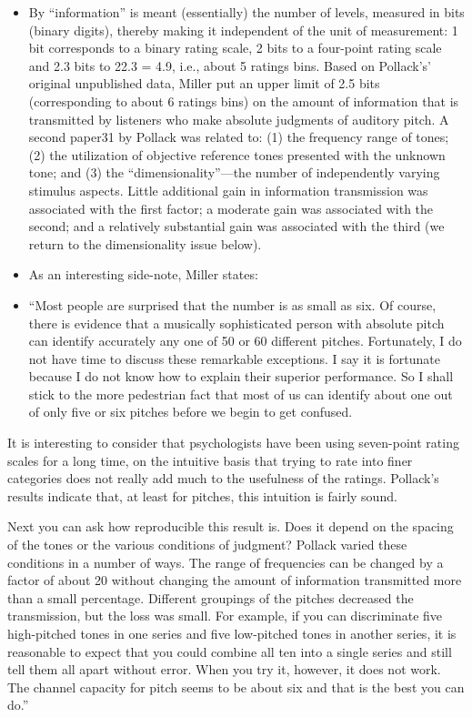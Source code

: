 \documentclass[
]{book}
\begin{document}
\begin{itemize}
\item
  By ``information'' is meant (essentially) the number of levels, measured in bits (binary digits), thereby making it independent of the unit of measurement: 1 bit corresponds to a binary rating scale, 2 bits to a four-point rating scale and 2.3 bits to 22.3 = 4.9, i.e., about 5 ratings bins. Based on Pollack's' original unpublished data, Miller put an upper limit of 2.5 bits (corresponding to about 6 ratings bins) on the amount of information that is transmitted by listeners who make absolute judgments of auditory pitch. A second paper31 by Pollack was related to: (1) the frequency range of tones; (2) the utilization of objective reference tones presented with the unknown tone; and (3) the ``dimensionality''---the number of independently varying stimulus aspects. Little additional gain in information transmission was associated with the first factor; a moderate gain was associated with the second; and a relatively substantial gain was associated with the third (we return to the dimensionality issue below).
\item
  As an interesting side-note, Miller states:
\item
  ``Most people are surprised that the number is as small as six. Of course, there is evidence that a musically sophisticated person with absolute pitch can identify accurately any one of 50 or 60 different pitches. Fortunately, I do not have time to discuss these remarkable exceptions. I say it is fortunate because I do not know how to explain their superior performance. So I shall stick to the more pedestrian fact that most of us can identify about one out of only five or six pitches before we begin to get confused.
\end{itemize}

It is interesting to consider that psychologists have been using seven-point rating scales for a long time, on the intuitive basis that trying to rate into finer categories does not really add much to the usefulness of the ratings. Pollack's results indicate that, at least for pitches, this intuition is fairly sound.

Next you can ask how reproducible this result is. Does it depend on the spacing of the tones or the various conditions of judgment? Pollack varied these conditions in a number of ways. The range of frequencies can be changed by a factor of about 20 without changing the amount of information transmitted more than a small percentage. Different groupings of the pitches decreased the transmission, but the loss was small. For example, if you can discriminate five high-pitched tones in one series and five low-pitched tones in another series, it is reasonable to expect that you could combine all ten into a single series and still tell them all apart without error. When you try it, however, it does not work. The channel capacity for pitch seems to be about six and that is the best you can do.''
\end{document}
